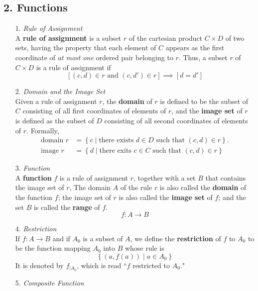 \subsection*{2. Functions}

\begin{enumerate}
    \item[1.] \emph{Rule of Assignment}\\
    A {\bf rule of assignment} is a subset $r$ of the cartesian product $C \times D$ of two sets, having the property that each element of $C$ appears as the first coordinate of \emph{at most one} ordered pair belonging to $r$. Thus, a subset $r$ of $C \times D$ is a rule of assignment if 
    $$\left[(c,d) \in r \text{ and } (c, d') \in r\right] \implies \left[d = d'\right]$$
    \item[2.] \emph{Domain and the Image Set}\\
    Given a rule of assignment $r$, the {\bf domain} of $r$ is defined to be the subset of $C$ consisting of all first coordinates of elements of $r$, and the {\bf image set} of $r$ is defined as the subset of $D$ consisting of all second coordinates of elements of $r$. Formally,
    \begin{align*}
        \text{domain }r &= \left\{c \mid \text{there exists $d \in D$ such that $(c, d) \in r$}\right\}.\\
        \text{image }r & =\left\{d \mid \text{there exits $c \in C$ such that $(c, d) \in r$}\right\}
    \end{align*}
    \item[3.] \emph{Function}\\
    A {\bf function} $f$ is a rule of assignment $r$, together with a set $B$ that contains the image set of $r$, The domain $A$ of the rule $r$ is also called the {\bf domain} of the function $f$; the image set of $r$ is also called the {\bf image set} of $f$; and the set $B$ is called the {\bf range} of $f$.
    $$f: A \longrightarrow B$$
    \item[4.] \emph{Restriction}\\
    If $f: A \longrightarrow B$ and if $A_0$ is a subset of $A$, we define the {\bf restriction} of $f$ to $A_0$ to be the function mapping $A_0$ into $B$ whose rule is 
    $$\left\{\left(a, f(a)\right) \mid a \in A_0\right\}$$
    It is denoted by $f_{\mid A_0}$, which is read ``$f$ restricted to $A_0$."
    \item[5.] \emph{Composite Function}\\

\end{enumerate}
